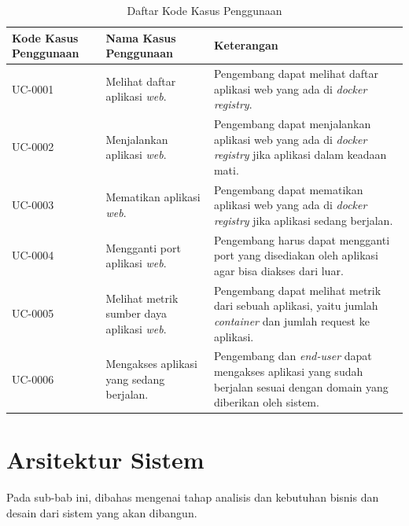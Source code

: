         \begin{longtable}{|p{}|p{}|p{}|} %
		    	
		    	\caption{Daftar Kode Kasus Penggunaan} \label{tabelKodeKasusPenggunaan} \\
		    	\hline
		    	\textbf{Kode Kasus Penggunaan} & \textbf{Nama Kasus Penggunaan} & \textbf{Keterangan} \\ \hline
		    	\endhead
		    	\endfoot
		    	\endlastfoot
		    	UC-0001 & Melihat daftar aplikasi \textit{web}. & Pengembang dapat melihat daftar aplikasi web yang ada di \textit{docker registry}. \\ \hline
		    	UC-0002 & Menjalankan aplikasi \textit{web}.  & Pengembang dapat menjalankan aplikasi web yang ada di \textit{docker registry} jika aplikasi dalam keadaan mati.\\ \hline
		    	UC-0003 & Mematikan aplikasi \textit{web}. & Pengembang dapat mematikan aplikasi web yang ada di \textit{docker registry} jika aplikasi sedang berjalan. \\ \hline
		    	UC-0004 & Mengganti port aplikasi \textit{web}. & Pengembang harus dapat mengganti port yang disediakan oleh aplikasi agar bisa diakses dari luar. \\ \hline
		    	UC-0005 & Melihat metrik sumber daya aplikasi \textit{web}. & Pengembang dapat melihat metrik dari sebuah aplikasi, yaitu jumlah \textit{container} dan jumlah request ke aplikasi. \\ \hline
                UC-0006 & Mengakses aplikasi yang sedang berjalan. & Pengembang dan \textit{end-user} dapat mengakses aplikasi yang sudah berjalan sesuai dengan domain yang diberikan oleh sistem. \\ \hline	
		    \end{longtable}

	\section{Arsitektur Sistem}
		Pada sub-bab ini, dibahas mengenai tahap analisis dan kebutuhan bisnis dan desain dari sistem yang akan dibangun.

